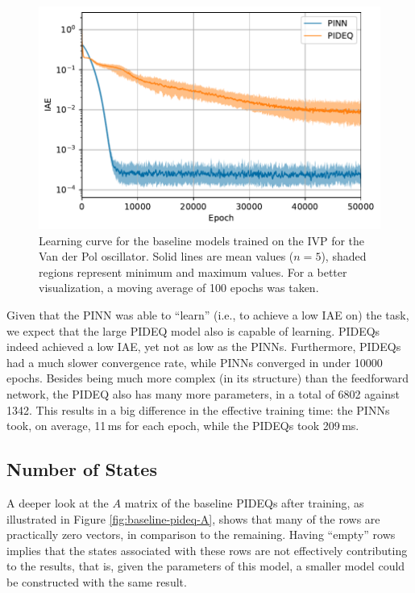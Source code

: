 \begin{figure}[h]
    \centering
	\includegraphics{images/exp_1_iae.pdf}
    \caption{Learning curve for the baseline models trained on the \gls{IVP} for the Van der Pol oscillator. Solid lines are mean values ($n=5$), shaded regions represent minimum and maximum values. For a better visualization, a moving average of 100 epochs was taken.}
    \label{fig:baseline-iae}
\end{figure}

Given that the \gls{PINN} was able to ``learn'' (i.e., to achieve a low IAE on) the task, we expect that the large \gls{PIDEQ} model also is capable of learning.
\glspl{PIDEQ} indeed achieved a low IAE, yet not as low as the \glspl{PINN}.
Furthermore, \glspl{PIDEQ} had a much slower convergence rate, while \glspl{PINN} converged in under 10000 epochs.
Besides being much more complex (in its structure) than the feedforward network, the \gls{PIDEQ} also has many more parameters, in a total of 6802 against 1342.
This results in a big difference in the effective training time: the \gls{PINN}s took, on average, 11\,ms for each epoch, while the \gls{PIDEQ}s took 209\,ms.

\subsection{Number of States}

A deeper look at the $A$ matrix of the baseline \gls{PIDEQ}s after training, as illustrated in Figure \ref{fig:baseline-pideq-A}, shows that many of the rows are practically zero vectors, in comparison to the remaining.
Having ``empty'' rows implies that the states associated with these rows are not effectively contributing to the results, that is, given the parameters of this model, a smaller model could be constructed with the same result.  

